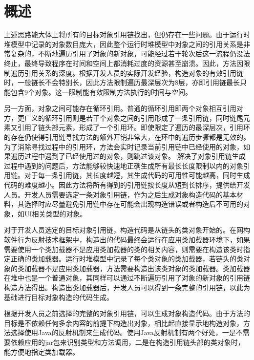 \documentclass[a4paper]{article}
\begin{document}

\section{概述} \label{overview}%
上述思路能大体上将所有的目标对象引用链找出，但仍存在一些问题。由于运行时堆模型中记录的对象数目庞大，因此整个运行时堆模型中对象之间的引用关系是非常复杂的，不断地遍历引用了对象的新对象，可能经过若干轮次后这一流程仍没法终止，最终导致程序在时间和空间上都消耗过度的资源甚至崩溃。因此，方法因限制遍历引用关系的深度。根据开发人员的实际开发经验，构造对象的有效引用链时，一般链长不会特别长，因此方法限制遍历最深层次为8层，亦即引用链最长只能包含9个对象。这一限制能有效限制方法执行的时间与空间。

另一方面，对象之间可能存在循环引用。普通的循环引用即两个对象相互引用对方，更广义的循环引用则是若干个对象之间的引用形成了一条引用链，同时链尾元素又引用了链头部元素，形成了一个引用环。即使限定了遍历的最深层次，引用环的存在仍使得引用链寻找方法的额外开销非常大，在环中的遍历步骤都是无效的。为了消除寻找过程中的引用环，方法会实时记录当前引用链中已经使用的对象，如果遍历过程中遇到了已经使用过的对象，则跳过该对象。
解决了对象引用链生成过程中遇到的问题后，方法能够较快速地正确生成所有最长长度限制以内的对象引用链。对于每一条引用链，其长度越短，其生成代码的可用性可能越高，同时生成代码的难度越小。因此方法将所有得到的引用链按长度从短到长排序，提供给开发人员。开发人员需要选定一条对象引用链，作为之后生成对象构造代码的基本材料，其选择时应尽量避免引用链中存在可能会出现构造错误或者构造后不可用的对象，如UI相关类型的对象。

对于开发人员选定的目标对象引用链，构造代码是从链头的类对象开始的。在网构软件行为反射技术框架中，构造出的代码最终会运行在应用类加载器环境下，如果需要使用一个类加载器不是应用类加载器的类的相关内容，则需要在构造该类时指定正确的类加载器。运行时堆模型中记录了每个类对象的类加载器，若链头的类对象的类加载器不是应用类加载器，方法需要构造出该类对象的类加载器。类加载器在堆中也是一个普通对象，其同样可以通过不断遍历引用了对象的新对象的引用链构造方法得出。构造出类加载器后，开发人员可以得到一条完整的引用链，以此为基础进行目标对象构造的代码生成。

根据开发人员之前选择的完整的对象引用链，可以生成对象构造代码。由于方法的目标是不依赖任何多余内容的前提下构造出对象，相比起直接显示地构造对象，方法选择使用Java的反射机制来生成代码。使用Java反射机制有两个好处，一是不需要依赖应用的jar包来识别类型和方法调用，二是在构造引用链头部的类对象时，能方便地指定类加载器。
\end{document}
